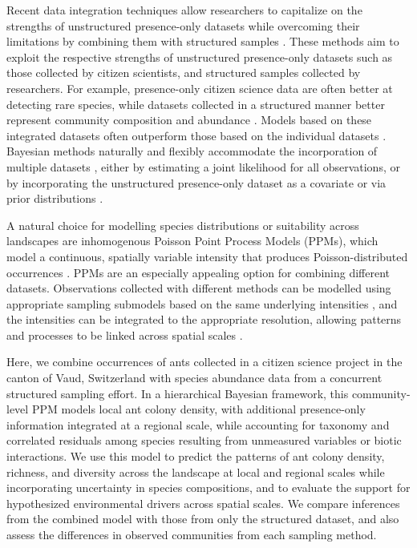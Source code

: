 \documentclass[preprint,final,times,12pt,3p]{elsarticle}
\begin{document}
Recent data integration techniques allow researchers to capitalize on the strengths of unstructured presence-only datasets while overcoming their limitations by combining them with structured samples \citep{Isaac2019,Miller2019}. These methods aim to exploit the respective strengths of unstructured presence-only datasets such as those collected by citizen scientists, and structured samples collected by researchers. For example, presence-only citizen science data are often better at detecting rare species, while datasets collected in a structured manner better represent community composition and abundance \citep{Steen2019,Henckel2020,Pernat2020}. Models based on these integrated datasets often outperform those based on the individual datasets \citep{Dorazio2014b,Fithian2015,Koshkina2017a}. Bayesian methods naturally and flexibly accommodate the incorporation of multiple datasets \citep{Clark2005,BeckEtAl2012,Szewczyk2018}, either by estimating a joint likelihood for all observations, or by incorporating the unstructured presence-only dataset as a covariate or via prior distributions \citep{Fletcher2019,Isaac2019,Miller2019}. 

A natural choice for modelling species distributions or suitability across landscapes are inhomogenous Poisson Point Process Models (PPMs), which model a continuous, spatially variable intensity that produces Poisson-distributed occurrences \citep{Renner2013a,Renner2015}. PPMs are an especially appealing option for combining different datasets. Observations collected with different methods can be modelled using appropriate sampling submodels based on the same underlying intensities \citep{Fithian2015,Hefley2016,Koshkina2017a,Fletcher2019,Renner2019}, and the intensities can be integrated to the appropriate resolution, allowing patterns and processes to be linked across spatial scales \citep{Keil2014,Hefley2016}.

Here, we combine occurrences of ants collected in a citizen science project in the canton of Vaud, Switzerland with species abundance data from a concurrent structured sampling effort. In a hierarchical Bayesian framework, this community-level PPM models local ant colony density, with additional presence-only information integrated at a regional scale, while accounting for taxonomy and correlated residuals among species resulting from unmeasured variables or biotic interactions. We use this model to predict the patterns of ant colony density, richness, and diversity across the landscape at local and regional scales while incorporating uncertainty in species compositions, and to evaluate the support for hypothesized environmental drivers across spatial scales. We compare inferences from the combined model with those from only the structured dataset, and also assess the differences in observed communities from each sampling method. 
\end{document}
